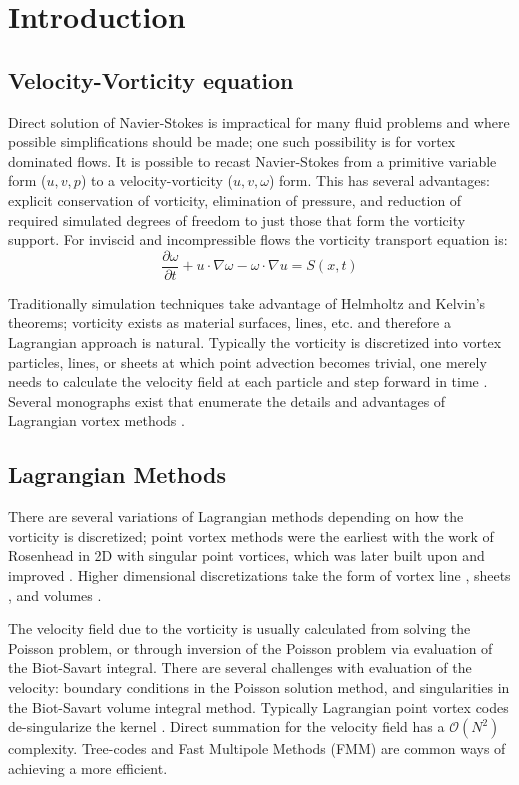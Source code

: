 \documentclass[letterpaper,12pt]{report}
\newcommand{\ben}[1]{\begin{equation}\label{#1}}
\newcommand{\ee}{\end{equation}}
\begin{document}
\chapter{Introduction}
\section{Velocity-Vorticity equation}
Direct solution of Navier-Stokes is impractical for many fluid problems and where possible simplifications should be made; one such possibility is for vortex dominated flows. It is possible to recast Navier-Stokes from a primitive variable form ($u,v,p$) to a velocity-vorticity ($u,v,\omega$) form. This has several advantages: explicit conservation of vorticity, elimination of pressure, and reduction of required simulated degrees of freedom to just those that form the vorticity support. For inviscid and incompressible flows the vorticity transport equation is:
\ben{VV3D} \frac{\partial \omega}{\partial t} + u \cdot \nabla \omega - \omega \cdot \nabla u = S(x,t)\ee

Traditionally simulation techniques take advantage of Helmholtz and Kelvin's theorems; vorticity exists as material surfaces, lines, etc. and therefore a Lagrangian approach is natural. Typically the vorticity is discretized into vortex particles, lines, or sheets at which point advection becomes trivial, one merely needs to calculate the velocity field at each particle and step forward in time \cite{Strain1996,MoussaCarley2008,KoumLeonard1995}. Several monographs exist that enumerate the details and advantages of Lagrangian vortex methods \cite{Lugt1983,Saffman1992,Speziale1987}.

\section{Lagrangian Methods}
There are several variations of Lagrangian methods depending on how the vorticity is discretized; point vortex methods were the earliest with the work of Rosenhead \cite{Point1} in 2D with singular point vortices, which was later built upon and improved \cite{Point2,Point3,Point4,Point5,Point6}. Higher dimensional discretizations take the form of vortex line \cite{Line1,Line2,Line3,Line4}, sheets \cite{Sheet1,Sheet2,Sheet3}, and volumes \cite{Volumes1,Volumes2,Volumes3}.

The velocity field due to the vorticity is usually calculated from solving the Poisson problem, or through inversion of the Poisson problem via evaluation of the Biot-Savart integral. There are several challenges with evaluation of the velocity: boundary conditions in the Poisson solution method, and singularities in the Biot-Savart volume integral method. Typically Lagrangian point vortex codes de-singularize the kernel \cite{Rosenhead1930,Moore1972}. Direct summation for the velocity field has a $\mathcal{O}(N^2)$ complexity. Tree-codes \cite{LindsayKrasny2001} and Fast Multipole Methods (FMM) \cite{Strain1997} are common ways of achieving a more efficient.
\end{document}

